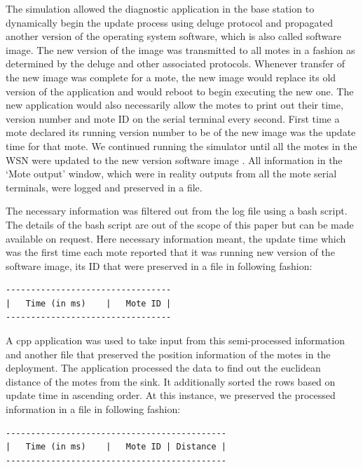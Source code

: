 \documentclass[conference,final]{IEEEtran}
\begin{document}
The simulation allowed the diagnostic application in the base station to dynamically begin the update process using deluge protocol %
and propagated another version of the operating system software, which is also called software image. 
The new version of the image was transmitted to all motes in a fashion as determined by the deluge and other associated protocols. 
Whenever transfer of the new image was complete for a mote, the new image would replace its old version of the application and would reboot to begin executing the new one.
The new application would also necessarily allow the motes to print out their time, version number and mote ID on the serial terminal every second. 
First time a mote declared its running version number to be of the new image was the update time for that mote.
We continued running the simulator until all the motes in the WSN were updated to the new  version software image . 
All information in the `Mote output' window, which were in reality outputs from all the mote serial terminals, were logged and preserved in a file.

The necessary information was filtered out from the log file using a bash script. 
The details of the bash script are out of the scope of this paper but can be made available on request.
Here necessary information meant, the update time which was the first time each mote reported that it was running new version of the software image, its ID that were preserved in a file in following fashion:
\begin{verbatim}
---------------------------------
| 	Time (in ms)	|	Mote ID	|
---------------------------------
\end{verbatim}

A cpp application was used to take input from this semi-processed information and another file that preserved the position information of the motes in the deployment.
The application processed the data to find out the euclidean distance of the motes from the sink.
It additionally sorted the rows based on update time in ascending order.
At this instance, we preserved the processed information in a file in following fashion:
\begin{verbatim}
--------------------------------------------
| 	Time (in ms)	|	Mote ID	| Distance |
--------------------------------------------
\end{verbatim}
\end{document}

